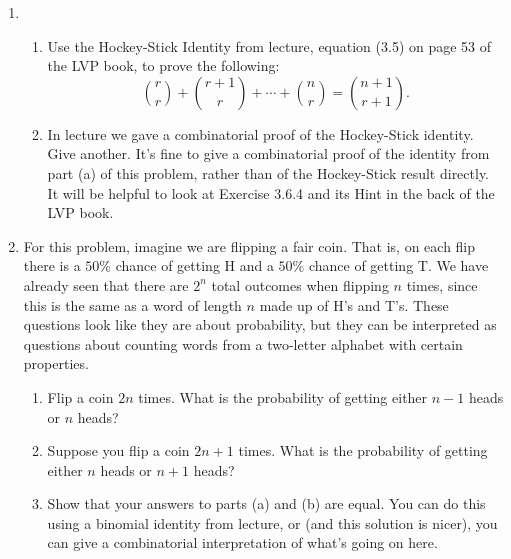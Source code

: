 \documentclass[11pt]{article}
\begin{document}
\begin{enumerate}
\item 
\begin{enumerate} 
\item Use the Hockey-Stick Identity from lecture, equation (3.5) on page 53 of the LVP book, to prove the following:
\[ 
\binom{r}{r} + \binom{r+1}{r} + \cdots + \binom{n}{r} = \binom{n+1}{r+1}.
\]
\item In lecture we gave a combinatorial proof of the Hockey-Stick identity.  Give another.  It's fine to give a combinatorial proof of the identity from part (a) of this problem, rather than of the Hockey-Stick result directly. It will be helpful to look at Exercise 3.6.4 and its Hint in the back of the LVP book.
\end{enumerate}



\item For this problem, imagine we are flipping a fair coin.  That is, on each flip there is a $50\%$ chance of getting H and a $50\%$ chance of getting T.  We have already seen that there are $2^n$ total outcomes when flipping $n$ times, since this is the same as a word of length $n$ made up of H's and T's.  These questions look like they are about probability, but they can be interpreted as questions about counting words from a two-letter alphabet with certain properties.
\begin{enumerate}
\item Flip a coin $2n$ times.  What is the probability of getting either $n-1$ heads or $n$ heads?
\item Suppose you flip a coin $2n+1$ times.  What is the probability of getting either $n$ heads or $n+1$ heads? 
\item Show that your answers to parts (a) and (b) are equal.  You can do this using a binomial identity from lecture, or (and this solution is nicer), you can give a combinatorial interpretation of what's going on here.
\end{enumerate}



\end{enumerate}
\end{document}
